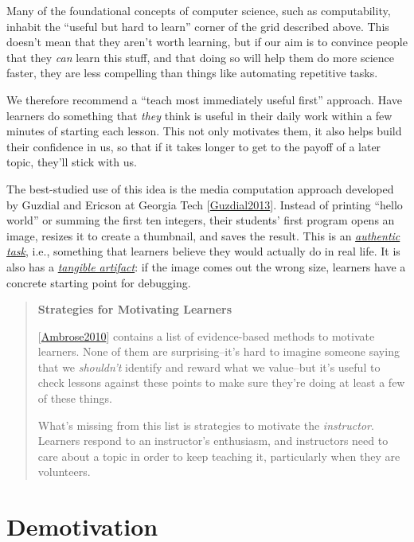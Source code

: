 \documentclass[10pt,statementpaper]{memoir}
\begin{document}
Many of the foundational concepts of computer science, such as
computability, inhabit the ``useful but hard to learn'' corner of the
grid described above. This doesn't mean that they aren't worth learning,
but if our aim is to convince people that they \emph{can} learn this
stuff, and that doing so will help them do more science faster, they are
less compelling than things like automating repetitive tasks.

We therefore recommend a ``teach most immediately useful first''
approach. Have learners do something that \emph{they} think is useful in
their daily work within a few minutes of starting each lesson. This not
only motivates them, it also helps build their confidence in us, so that
if it takes longer to get to the payoff of a later topic, they'll stick
with us.

The best-studied use of this idea is the media computation approach
developed by Guzdial and Ericson at Georgia Tech
{[}\href{biblio.html\#guzdial-mediacomp-retrospective}{Guzdial2013}{]}.
Instead of printing ``hello world'' or summing the first ten integers,
their students' first program opens an image, resizes it to create a
thumbnail, and saves the result. This is an
\emph{\href{gloss.html\#authentic-task}{authentic task}}, i.e.,
something that learners believe they would actually do in real life. It
is also has a \emph{\href{gloss.html\#tangible-artifact}{tangible
artifact}}: if the image comes out the wrong size, learners have a
concrete starting point for debugging.

\begin{quote}
\textbf{Strategies for Motivating Learners}

{[}\href{biblio.html\#ambrose-hlw}{Ambrose2010}{]} contains a list of
evidence-based methods to motivate learners. None of them are
surprising--it's hard to imagine someone saying that we \emph{shouldn't}
identify and reward what we value--but it's useful to check lessons
against these points to make sure they're doing at least a few of these
things.

What's missing from this list is strategies to motivate the
\emph{instructor}. Learners respond to an instructor's enthusiasm, and
instructors need to care about a topic in order to keep teaching it,
particularly when they are volunteers.
\end{quote}

\section{Demotivation}\label{demotivation}
\end{document}
